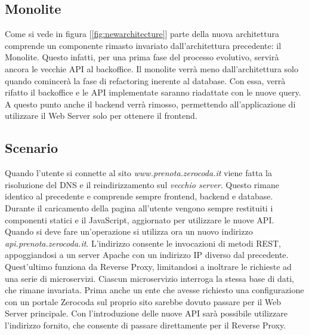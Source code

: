 \subsection{Monolite}
Come si vede in figura [\ref{fig:newarchitecture}] parte della nuova architettura comprende un componente rimasto invariato dall'architettura precedente: il Monolite. Questo infatti, per una prima fase del processo evolutivo, servirà ancora le vecchie API al backoffice. Il monolite verrà meno dall'architettura solo quando comincerà la fase di refactoring inerente al database. Con essa, verrà rifatto il backoffice e le API implementate saranno riadattate con le nuove query. A questo punto anche il backend verrà rimosso, permettendo all'applicazione di utilizzare il Web Server solo per ottenere il frontend.

\subsection{Scenario}
Quando l'utente si connette al sito \emph{www.prenota.zerocoda.it} viene fatta la risoluzione del DNS e il reindirizzamento sul \textit{vecchio server}. Questo rimane identico al precedente e comprende sempre frontend, backend e database. Durante il caricamento della pagina all'utente vengono sempre restituiti i componenti statici e il JavaScript, aggiornato per utilizzare le nuove API. Quando si deve fare un'operazione si utilizza ora un nuovo indirizzo \emph{api.prenota.zerocoda.it}. L'indirizzo consente le invocazioni di metodi REST, appoggiandosi a un server Apache con un indirizzo IP diverso dal precedente. Quest'ultimo funziona da Reverse Proxy, limitandosi a inoltrare le richieste ad una serie di microservizi. Ciascun microservizio interroga la stessa base di dati, che rimane invariata. Prima anche un ente che avesse richiesto una configurazione con un portale Zerocoda sul proprio sito sarebbe dovuto passare per il Web Server principale. Con l'introduzione delle nuove API sarà possibile utilizzare l'indirizzo fornito, che consente di passare direttamente per il Reverse Proxy.

